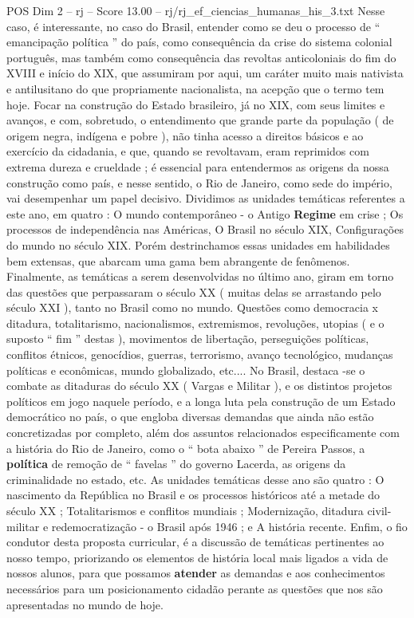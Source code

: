 \begin{textsample}{POS Dim 2 – rj – Score 13.00 – rj/rj\_ef\_ciencias\_humanas\_his\_3.txt}
Nesse caso, é interessante, no caso do Brasil, entender como se deu o processo de “ emancipação política ” do país, como consequência da crise do sistema colonial português, mas também como consequência das revoltas anticoloniais do fim do XVIII e início do XIX, que assumiram por aqui, um caráter muito mais nativista e antilusitano do que propriamente nacionalista, na acepção que o termo tem hoje.
Focar na construção do Estado brasileiro, já no XIX, com seus limites e avanços, e com, sobretudo, o entendimento que grande parte da população ( de origem negra, indígena e pobre ), não tinha acesso a direitos básicos e ao exercício da cidadania, e que, quando se revoltavam, eram reprimidos com extrema dureza e crueldade ; é essencial para entendermos as origens da nossa construção como país, e nesse sentido, o Rio de Janeiro, como sede do império, vai desempenhar um papel decisivo.
Dividimos as unidades temáticas referentes a este ano, em quatro : O mundo contemporâneo - o Antigo \textbf{Regime} em crise ; Os processos de independência nas Américas, O Brasil no século XIX, Configurações do mundo no século XIX.
Porém destrinchamos essas unidades em habilidades bem extensas, que abarcam uma gama bem abrangente de fenômenos.
Finalmente, as temáticas a serem desenvolvidas no último ano, giram em torno das questões que perpassaram o século XX ( muitas delas se arrastando pelo século XXI ), tanto no Brasil como no mundo.
Questões como democracia x ditadura, totalitarismo, nacionalismos, extremismos, revoluções, utopias ( e o suposto “ fim ” destas ), movimentos de libertação, perseguições políticas, conflitos étnicos, genocídios, guerras, terrorismo, avanço tecnológico, mudanças políticas e econômicas, mundo globalizado, etc....
No Brasil, destaca -se o combate as ditaduras do século XX ( Vargas e Militar ), e os distintos projetos políticos em jogo naquele período, e a longa luta pela construção de um Estado democrático no país, o que engloba diversas demandas que ainda não estão concretizadas por completo, além dos assuntos relacionados especificamente com a história do Rio de Janeiro, como o “ bota abaixo ” de Pereira Passos, a \textbf{política} de remoção de “ favelas ” do governo Lacerda, as origens da criminalidade no estado, etc.
As unidades temáticas desse ano são quatro : O nascimento da República no Brasil e os processos históricos até a metade do século XX ; Totalitarismos e conflitos mundiais ; Modernização, ditadura civil-militar e redemocratização - o Brasil após 1946 ; e A história recente.
Enfim, o fio condutor desta proposta curricular, é a discussão de temáticas pertinentes ao nosso tempo, priorizando os elementos de história local mais ligados a vida de nossos alunos, para que possamos \textbf{atender} as demandas e aos conhecimentos necessários para um posicionamento cidadão perante as questões que nos são apresentadas no mundo de hoje.

\end{textsample}
